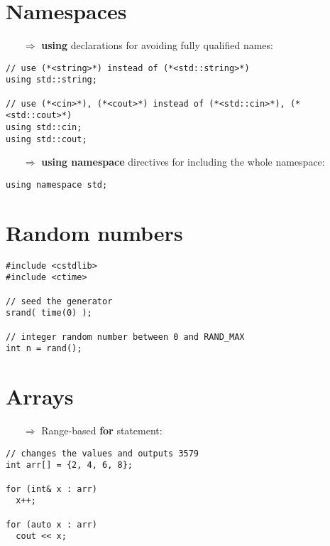 \documentclass[10pt]{article}
\begin{document}
%
%
\section{Namespaces}
\small
\begin{enumerate}
\item[$\Rightarrow$] \textbf{using} declarations for avoiding fully qualified names:
\end{enumerate}
\begin{lstlisting}
// use (*<string>*) instead of (*<std::string>*)
using std::string;

// use (*<cin>*), (*<cout>*) instead of (*<std::cin>*), (*<std::cout>*)
using std::cin;
using std::cout;
\end{lstlisting}
\begin{enumerate}
\item[$\Rightarrow$] \textbf{using namespace} directives for including the whole namespace:
\end{enumerate}
\begin{lstlisting}
using namespace std;
\end{lstlisting}
%
%
\section{Random numbers}
\small
\begin{lstlisting}
#include <cstdlib>
#include <ctime>

// seed the generator
srand( time(0) );

// integer random number between 0 and RAND_MAX
int n = rand();
\end{lstlisting}
%
%
\section{Arrays}
\small
\begin{enumerate}
\item[$\Rightarrow$] Range-based \textbf{for} statement:
\end{enumerate}
\begin{lstlisting}
// changes the values and outputs 3579
int arr[] = {2, 4, 6, 8};

for (int& x : arr)
  x++;

for (auto x : arr)
  cout << x;
\end{lstlisting}
%
%
\end{document}
